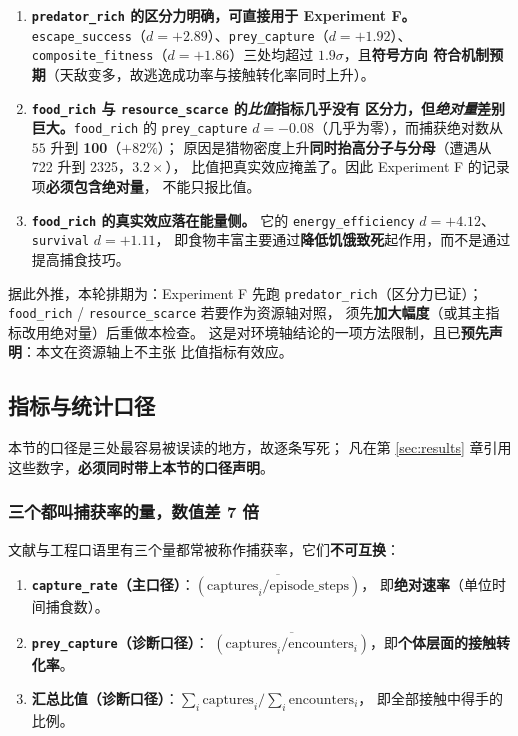 \begin{enumerate}
  \item \textbf{\texttt{predator\_rich} 的区分力明确，可直接用于 Experiment F。}
        \texttt{escape\_success}（$d=+2.89$）、\texttt{prey\_capture}（$d=+1.92$）、
        \texttt{composite\_fitness}（$d=+1.86$）三处均超过 $1.9\sigma$，且\textbf{符号方向
        符合机制预期}（天敌变多，故逃逸成功率与接触转化率同时上升）。
  \item \textbf{\texttt{food\_rich} 与 \texttt{resource\_scarce} 的\emph{比值}指标几乎没有
        区分力，但\emph{绝对量}差别巨大。}\texttt{food\_rich} 的 \texttt{prey\_capture}
        $d=-0.08$（几乎为零），而捕获绝对数从 $55$ 升到 \textbf{100}（$+82\%$）；
        原因是猎物密度上升\textbf{同时抬高分子与分母}（遭遇从 722 升到 2325，$3.2\times$），
        比值把真实效应掩盖了。因此 Experiment F 的记录项\textbf{必须包含绝对量}，
        不能只报比值。
  \item \textbf{\texttt{food\_rich} 的真实效应落在能量侧。}
        它的 \texttt{energy\_efficiency} $d=+4.12$、\texttt{survival} $d=+1.11$，
        即食物丰富主要通过\textbf{降低饥饿致死}起作用，而不是通过提高捕食技巧。
\end{enumerate}

据此外推，本轮排期为：Experiment F 先跑 \texttt{predator\_rich}（区分力已证）；
\texttt{food\_rich} / \texttt{resource\_scarce} 若要作为资源轴对照，
须先\textbf{加大幅度}（或其主指标改用绝对量）后重做本检查。
这是对环境轴结论的一项方法限制，且已\textbf{预先声明}：本文在资源轴上不主张
比值指标有效应。

\subsection{指标与统计口径}\label{sec:exp-metrics}

本节的口径是三处最容易被误读的地方，故逐条写死；
凡在第 \ref{sec:results} 章引用这些数字，\textbf{必须同时带上本节的口径声明}。

\subsubsection{三个都叫捕获率的量，数值差 7 倍}

文献与工程口语里有三个量都常被称作捕获率，它们\textbf{不可互换}：

\begin{enumerate}
  \item \textbf{\texttt{capture\_rate}（主口径）}：$\overline{(\text{captures}_i/\text{episode\_steps})}$，
        即\textbf{绝对速率}（单位时间捕食数）。
  \item \textbf{\texttt{prey\_capture}（诊断口径）}：
        $\overline{(\text{captures}_i/\text{encounters}_i)}$，即\textbf{个体层面的接触转化率}。
  \item \textbf{汇总比值（诊断口径）}：$\sum_i\text{captures}_i/\sum_i\text{encounters}_i$，
        即全部接触中得手的比例。
\end{enumerate}

